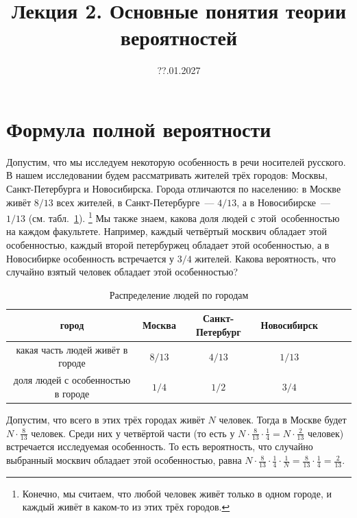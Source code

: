 \documentclass[11pt]{article}
\title{Лекция 2. Основные понятия теории вероятностей}
\date{??.01.2027}
\begin{document}
\section{Формула полной вероятности}
Допустим, что мы исследуем некоторую особенность в речи носителей русского. В нашем
исследовании будем рассматривать жителей трёх городов: Москвы, Санкт-Петербурга и
Новосибирска. Города отличаются по населению: в Москве живёт $8/13$ всех жителей,
в Санкт-Петербурге~--- $4/13$, а в Новосибирске~--- $1/13$ (см. табл.~\ref{osobennost}).
\footnote{Конечно, мы считаем, что любой человек живёт только в одном городе, и каждый
живёт в каком-то из этих трёх городов.} Мы также знаем, какова доля людей с этой\
особенностью на каждом факультете. Например, каждый четвёртый москвич обладает этой
особенностью, каждый второй петербуржец обладает этой особенностью, а в Новосибирке
особенность встречается у $3/4$ жителей. Какова вероятность, что случайно взятый
человек обладает этой особенностью?

\begin{table}[hbt]
	\centering
		\begin{tabular}{|c|c|c|c|c|c|c|}
			\hline
			город & Москва & Санкт-Петербург & Новосибирск \\
			\hline
			какая часть людей живёт в городе & $8/13$  & $4/13$ & $1/13$ \\
			\hline
			доля людей с особенностью в городе & $1/4$ & $1/2$ & $3/4$\\
			\hline
		\end{tabular}
		\caption{Распределение людей по городам}\label{osobennost}
\end{table}

Допустим, что всего в этих трёх городах живёт $N$ человек. Тогда в Москве
будет $N \cdot \frac{8}{13}$ человек. Среди них у четвёртой части (то есть у
$N \cdot \frac{8}{13} \cdot \frac{1}{4}=N \cdot \frac{2}{13}$ человек) встречается
исследуемая особенность. То есть вероятность, что случайно выбранный москвич
обладает этой особенностью, равна $N \cdot \frac{8}{13} \cdot \frac{1}{4}
\cdot \frac{1}{N} = \frac{8}{13} \cdot \frac{1}{4}= \frac{2}{13}$.
\end{document}
